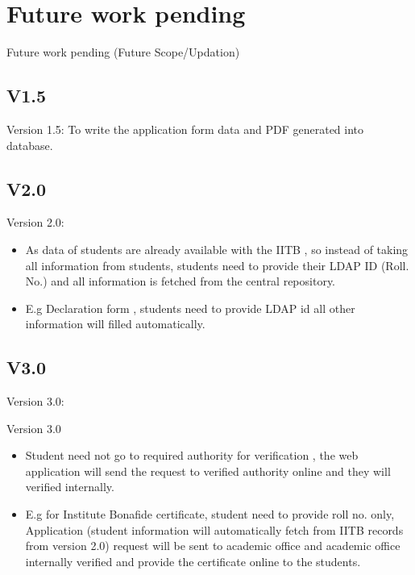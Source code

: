 \documentclass [] {beamer}
\begin{document}
\section{Future work pending}
\begin{frame}{Future work pending (Future Scope/Updation)}
\subsection{V1.5}
\begin{block}{Version 1.5:}
To write the application form data and PDF generated into database.
\end{block}
\subsection{V2.0}
\begin{block}{Version 2.0:}
\begin{itemize}
    \item As data of students are already available with the IITB , so instead of taking all information from students, students need to provide their LDAP ID (Roll. No.) and all information is fetched from the central repository.
    \item  E.g  Declaration form , students need to provide LDAP id all other information will filled automatically.
\end{itemize}

\end{block}
\end{frame}
\subsection{V3.0}
\begin{frame}{Version 3.0:}

\begin{block}{Version 3.0}
 \begin{itemize}
     \item   Student need not go to required authority for verification , the web application will send the request to verified authority online and they will verified internally.
     \item
     E.g for Institute Bonafide certificate, student need to provide roll no. only, Application (student information will automatically fetch from IITB records from version 2.0) request will be sent to academic office and academic office internally verified and provide the certificate online to the students.
     
 \end{itemize}
\end{block}

\end{frame}
\end{document}

